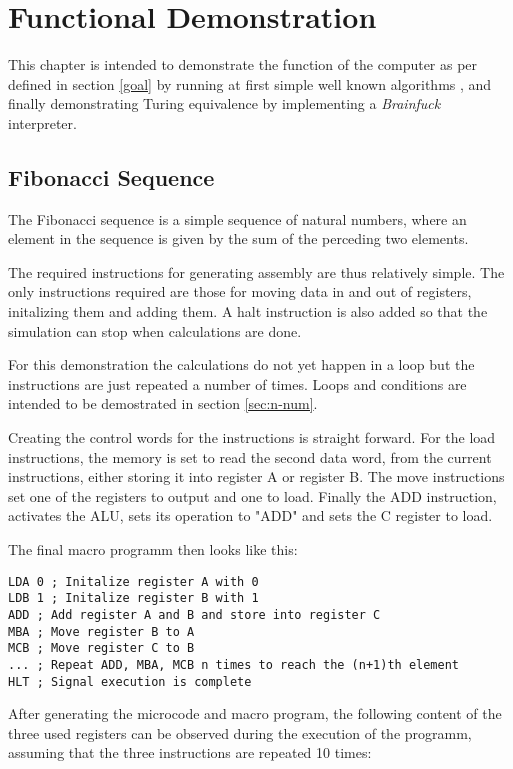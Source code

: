 \chapter{Functional Demonstration} \label{chap:demo}
This chapter is intended to demonstrate the function of the computer as per defined in section \ref{goal} by running at first simple well known algorithms \cite{chatgptalgoidea}, and finally demonstrating Turing equivalence by implementing a \textit{Brainfuck} interpreter. %

\section{Fibonacci Sequence}
The Fibonacci sequence is a simple sequence of natural numbers, where an element in the sequence is given by the sum of the perceding two elements.

The required instructions for generating assembly are thus relatively simple. The only instructions required are those for moving data in and out of registers, initalizing them and adding them. A halt instruction is also added so that the simulation can stop when calculations are done. 

For this demonstration the calculations do not yet happen in a loop but the instructions are just repeated a number of times. Loops and conditions are intended to be demostrated in section \ref{sec:n-num}.

Creating the control words for the instructions is straight forward. For the load instructions, the memory is set to read the second data word, from the current instructions, either storing it into register A or register B. The move instructions set one of the registers to output and one to load. Finally the ADD instruction, activates the ALU, sets its operation to "ADD" and sets the C register to load. 

The final macro programm then looks like this: 
\begin{lstlisting}[language={[x86masm]Assembler}, caption=Assembly code to calculate assembly, label=lst:fib]
LDA 0 ; Initalize register A with 0
LDB 1 ; Initalize register B with 1
ADD ; Add register A and B and store into register C
MBA ; Move register B to A
MCB ; Move register C to B
... ; Repeat ADD, MBA, MCB n times to reach the (n+1)th element
HLT ; Signal execution is complete
\end{lstlisting}

After generating the microcode and macro program, the following content of the three used registers can be observed during the execution of the programm, assuming that the three instructions are repeated 10 times:

